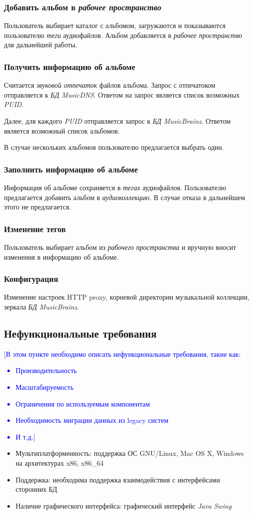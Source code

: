 \documentclass[pdftex,12pt,a4paper]{report}
\providecommand{\comment}[1]{\textcolor{blue}{#1}}
\begin{document}
\subsubsection{Добавить альбом в {\it рабочее пространство}}
Пользователь выбирает каталог с альбомом, загружаются и показываются пользователю {\it теги} аудиофайлов.
Альбом добавляется в {\it рабочее пространство} для дальнейшей работы.

\subsubsection{Получить информацию об альбоме}
Считается {\it звуковой отпечаток} файлов альбома. Запрос с отпечатоком отправляется к {\it БД MusicDNS}.
Ответом на запрос является список возможных {\it PUID}.

Далее, для каждого {\it PUID} отправляется запрос к {\it БД MusicBrainz}.
Ответом является возможный список альбомов.

В случае нескольких альбомов пользователю предлагается выбрать один.

\subsubsection{Заполнить информацию об альбоме}
Информация об альбоме сохраняется в {\it тегах} аудиофайлов.
Пользователю предлагается добавить альбом в {\it аудиоколлекцию}.
В случае отказа в дальнейшем этого не предлагается.

\subsubsection{Изменение тегов}
Пользователь выбирает альбом из {\it рабочего пространства} и вручную вносит изменения в информацию об альбоме.

\subsubsection{Конфигурация}
Изменение настроек HTTP proxy, корневой директории музыкальной коллекции, зеркала {\it БД MusicBrainz}.

\subsection{Нефункциональные требования}
\comment{[В этом пункте необходимо описать нефункциональные требования, такие как:
\begin{itemize}
	\item Производительность
	\item Масштабируемость
	\item Ограничения по используемым компонентам
	\item Необходимость миграции данных из legacy систем
	\item И т.д.]
\end{itemize}}

\begin{itemize}
	\item Мультиплатформенность: поддержка ОС GNU/Linux, Mac OS X, Windows на архитектурах x86, x86\_64
	\item Поддержка: необходима поддержка взаимодействия с интерфейсами сторонних БД
	\item Наличие графического интерфейса: графический интерфейс {\it Java Swing}
\end{itemize}
\end{document}
